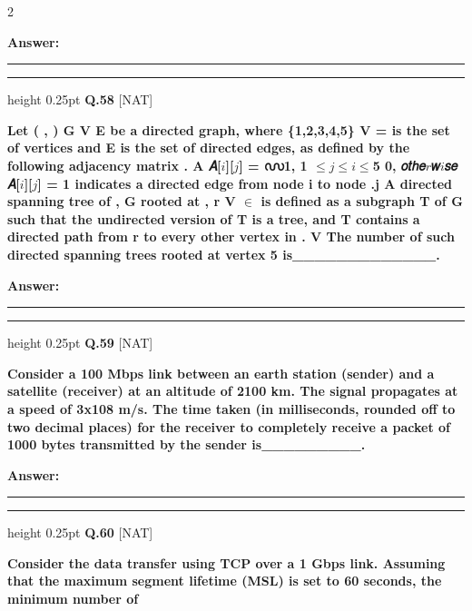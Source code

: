 \documentclass[a4paper,10pt,twoside]{article}
\begin{document}
\begin{multicols}{2}
\par\vspace{3pt}\noindent\textbf{Answer:} \rule{3.2cm}{0.4pt}
\par\vspace{6pt}\hrule height 0.25pt\vspace{6pt}
\noindent\textbf{Q.58} \hfill {\footnotesize\textsf{[NAT]}}
\par\vspace{2pt}
{\bfseries Let
( ,
)
G V E be a directed graph, where
\{1,2,3,4,5\}
V =
is the set of vertices and
E is the set of directed edges, as defined by the following adjacency matrix
.
A
𝐴[$i$][$j$] = ൜1, 1 $\le$$j$$\le$$i$$\le$5
0, 𝑜𝑡ℎ𝑒$r$𝑤$i$𝑠𝑒
𝐴[$i$][$j$] = 1 indicates a directed edge from node i to node .j A directed spanning
tree of
,
G rooted at
,
r
V
$\in$
is defined as a subgraph T of G such that the undirected
version of T is a tree, and T contains a directed path from r to every other vertex
in
.
V The number of such directed spanning trees rooted at vertex 5
is\_\_\_\_\_\_\_\_\_\_\_\_\_. \par}
\par\vspace{3pt}\noindent\textbf{Answer:} \rule{3.2cm}{0.4pt}
\par\vspace{6pt}\hrule height 0.25pt\vspace{6pt}
\noindent\textbf{Q.59} \hfill {\footnotesize\textsf{[NAT]}}
\par\vspace{2pt}
{\bfseries Consider a 100 Mbps link between an earth station (sender) and a satellite (receiver)
at an altitude of 2100 km. The signal propagates at a speed of 3x108 m/s. The time
taken (in milliseconds, rounded off to two decimal places) for the receiver to
completely receive a packet of 1000 bytes transmitted by the sender is\_\_\_\_\_\_\_\_\_. \par}
\par\vspace{3pt}\noindent\textbf{Answer:} \rule{3.2cm}{0.4pt}
\par\vspace{6pt}\hrule height 0.25pt\vspace{6pt}
\noindent\textbf{Q.60} \hfill {\footnotesize\textsf{[NAT]}}
\par\vspace{2pt}
{\bfseries Consider the data transfer using TCP over a 1 Gbps link. Assuming that the
maximum segment lifetime (MSL) is set to 60 seconds, the minimum number of
}
\end{multicols}
\end{document}
